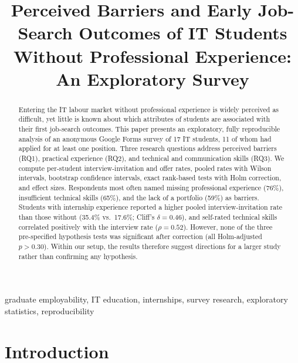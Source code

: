 \documentclass[conference]{IEEEtran}
\begin{document}
\title{Perceived Barriers and Early Job-Search Outcomes of IT Students Without Professional Experience: An Exploratory Survey}

\author{
}

\maketitle

\begin{abstract}
Entering the IT labour market without professional experience is widely perceived as difficult, yet little is known about which attributes of students are associated with their first job-search outcomes. This paper presents an exploratory, fully reproducible analysis of an anonymous Google Forms survey of 17 IT students, 11 of whom had applied for at least one position. Three research questions address perceived barriers (RQ1), practical experience (RQ2), and technical and communication skills (RQ3). We compute per-student interview-invitation and offer rates, pooled rates with Wilson intervals, bootstrap confidence intervals, exact rank-based tests with Holm correction, and effect sizes. Respondents most often named missing professional experience (76\%), insufficient technical skills (65\%), and the lack of a portfolio (59\%) as barriers. Students with internship experience reported a higher pooled interview-invitation rate than those without (35.4\% vs.\ 17.6\%; Cliff's $\delta=0.46$), and self-rated technical skills correlated positively with the interview rate ($\rho=0.52$). However, none of the three pre-specified hypothesis tests was significant after correction (all Holm-adjusted $p>0.30$). Within our setup, the results therefore suggest directions for a larger study rather than confirming any hypothesis.
\end{abstract}

\begin{IEEEkeywords}
graduate employability, IT education, internships, survey research, exploratory statistics, reproducibility
\end{IEEEkeywords}

\section{Introduction}
\end{document}
